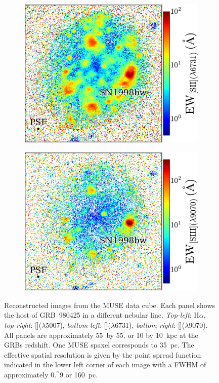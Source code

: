 \documentclass[traditabstract, referee]{aa}
\newcommand{\farc}{\hbox{$.\!\!^{\prime\prime}$}}
\newcommand{\ha}{H$\alpha$}
\newcommand{\sii}{[\ion{S}{ii}]}
\newcommand{\siii}{[\ion{S}{iii}]}
\newcommand{\oiii}{[\ion{O}{iii}]}
\begin{document}
\begin{figure}
\begin{subfigure}{.2425\textwidth}
  \includegraphics[width=1.0\linewidth]{Figs/MUSE_SN1998bw_SIIEW.pdf}
\end{subfigure}
\begin{subfigure}{.2425\textwidth}
  \includegraphics[width=1.0\linewidth]{Figs/MUSE_SN1998bw_SIIIEW.pdf}
\end{subfigure}
\caption{Reconstructed images from the MUSE data cube. Each panel shows the host of GRB~980425 in a different nebular line. \textit{Top-left}: \ha, \textit{top-right}: \oiii($\lambda$5007), \textit{bottom-left}: \sii($\lambda$6731), \textit{bottom-right}: \siii($\lambda$9070). All panels are approximately 55\arcsec~by 55\arcsec, or 10 by 10~kpc at the GRBs redshift. One MUSE spaxel corresponds to 35~pc. The effective spatial resolution is given by the point spread function indicated in the lower left corner of each image with a FWHM of approximately 0\farc{9} or 160~pc.}
\label{fig:EW}
\end{figure}
\end{document}
